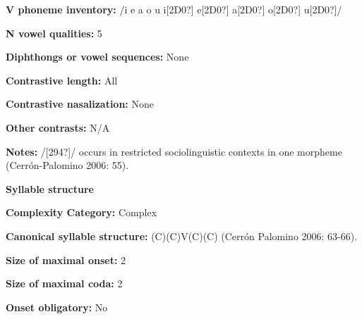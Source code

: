 \begin{styleBody}
\textbf{V phoneme inventory:} /i e a o u i[2D0?] e[2D0?] a[2D0?] o[2D0?] u[2D0?]/
\end{styleBody}

\begin{styleBody}
\textbf{N vowel qualities:} 5
\end{styleBody}

\begin{styleBody}
\textbf{Diphthongs or vowel sequences:} None
\end{styleBody}

\begin{styleBody}
\textbf{Contrastive length:} All
\end{styleBody}

\begin{styleBody}
\textbf{Contrastive nasalization:} None
\end{styleBody}

\begin{styleBody}
\textbf{Other contrasts:} N/A
\end{styleBody}

\begin{styleBody}
\textbf{Notes:} /[294?]/ occurs in restricted sociolinguistic contexts in one morpheme (Cerrón-Palomino 2006: 55).
\end{styleBody}

\begin{styleBody}
\textbf{Syllable structure}
\end{styleBody}

\begin{styleBody}
\textbf{Complexity Category:} Complex
\end{styleBody}

\begin{styleBody}
\textbf{Canonical syllable structure:} (C)(C)V(C)(C)\textbf{ }(Cerrón Palomino 2006: 63-66).
\end{styleBody}

\begin{styleBody}
\textbf{Size of maximal onset:} 2
\end{styleBody}

\begin{styleBody}
\textbf{Size of maximal coda:} 2
\end{styleBody}

\begin{styleBody}
\textbf{Onset obligatory:} No
\end{styleBody}

